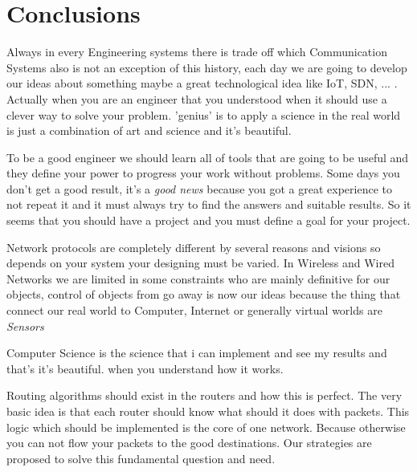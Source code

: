 
\chapter{Conclusions} %

\label{Conclusion} %



Always in every Engineering systems there is trade off which Communication Systems also is not an exception of this history, each day we are going to develop our ideas about something maybe a great technological idea like IoT, SDN, ... . Actually when you are an engineer that you understood when it should use a clever way to solve your problem. 'genius' is to apply a science in the real world is just a combination of art and science and it's beautiful.

To be a good engineer we should learn all of tools that are going to be useful and they define your power to progress your work without problems. Some days you don't get a good result, it's a \textit{good news }because you got a great experience to not repeat it and it must always try to find the answers and suitable results. So it seems that you should have a project and you must define a goal for your project.

Network protocols are completely different by several reasons and visions so depends on your system your designing must be varied. In Wireless and Wired Networks we are limited in some constraints who are mainly definitive for our objects, control of objects from go away is now our ideas because the thing that connect our real world to Computer, Internet or generally virtual worlds are \textit{Sensors}

Computer Science is the science that i can implement and see my results and that's it's beautiful. when you understand how it works.


Routing algorithms should exist in the routers and how this is perfect. The very basic idea is that each router should know what should it does with packets. This logic which should be implemented is the core of one network. Because otherwise you can not flow your packets to the good destinations. Our strategies are proposed to solve this fundamental question and need.
     



